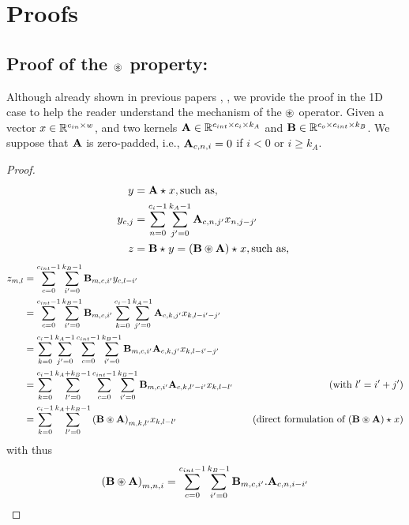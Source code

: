 \section{Proofs}\label{sec:ap_proofs}


    \subsection{Proof of the $\circledast$ property:}\label{sec:ap_proofs_mathbconv}
        Although already shown in previous papers \cite{li_preventing_2019}, \cite{xiao_dynamical_2018}, we provide the proof in the 1D case to help the reader understand the mechanism of the $\circledast$ operator.
        Given a vector $x\in\mathbb{R}^{c_{in}\times w}$, and two kernels $\mathbf{A}\in\mathbb{R}^{c_{int}\times c_i \times k_A}$ and $\mathbf{B}\in\mathbb{R}^{c_o\times c_{int} \times k_B}$. We suppose that $\mathbf{A}$ is zero-padded, i.e., $\mathbf{A}_{c,n,i} = 0$ if $i<0$ or $i\geq k_A$.
    \begin{proof}
    \begin{align*}
            y &= \mathbf{A}\star_{}x,\text{such as,  } \\ 
            y_{c,j}&=\sum_{n = 0}^{c_i-1}\sum_{j' = 0}^{k_A-1}\mathbf{A}_{c,n,j'}x_{n,j-j'}\\
    		z &= \mathbf{B}\star_{}y=(\mathbf{B}\circledast \mathbf{A})\star_{}x,\text{such as,  }
    \end{align*}
    \begin{align*}
      z_{m,l}&=\sum_{c = 0}^{c_{int}-1}\sum_{i' = 0}^{k_B-1}\mathbf{B}_{m,c,i'}y_{c,l-i'}\\
    		&=\sum_{c = 0}^{c_{int}-1}\sum_{i' = 0}^{k_B-1}\mathbf{B}_{m,c,i'}\sum_{k = 0}^{c_i-1}\sum_{j' = 0}^{k_A-1}\mathbf{A}_{c,k,j'}x_{k,l-i'-j'}\\
    		&= \sum_{k = 0}^{c_i-1}\sum_{j' = 0}^{k_A-1}\sum_{c = 0}^{c_{int}-1}\sum_{i' = 0}^{k_B-1}\mathbf{B}_{m,c,i'}\mathbf{A}_{c,k,j'}x_{k,l-i'-j'}\\
      &= \sum_{k = 0}^{c_i-1}\sum_{l' = 0}^{k_A+k_B-1}\sum_{c = 0}^{c_{int}-1}\sum_{i' = 0}^{k_B-1}\mathbf{B}_{m,c,i'}\mathbf{A}_{c,k,l'-i'}x_{k,l-l'}   &\quad (\text{with } l'=i'+j')\\
    		&= \sum_{k = 0}^{c_i-1}\sum_{l' = 0}^{k_A+k_B-1}{(\mathbf{B}\circledast \mathbf{A})}_{m,k,l'}x_{k,l-l'}   &\quad (\text{direct formulation of } (\mathbf{B}\circledast \mathbf{A})\star_{}x)
    \end{align*}
      with thus
      \[
      {(\mathbf{B}\circledast \mathbf{A})}_{m,n,i} = \sum_{c = 0}^{c_{int}-1}\sum_{i' = 0}^{k_B-1} \mathbf{B}_{m,c,i'} . \mathbf{A}_{c,n,i-i'}
      \]
\end{proof}


